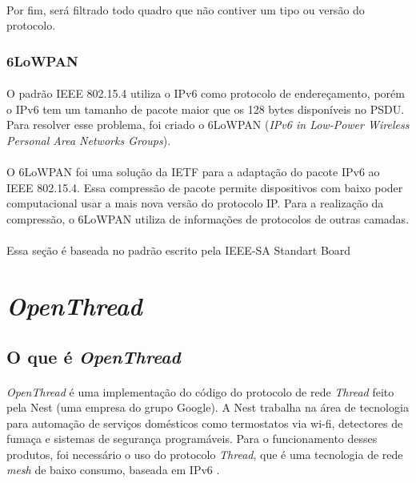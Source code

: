 \paragraph{} Por fim, será filtrado todo quadro que não contiver um tipo ou versão do protocolo. 

\subsubsection{6LoWPAN}
\paragraph{} O padrão IEEE 802.15.4 utiliza o IPv6 como protocolo de endereçamento, porém o IPv6 tem um tamanho de pacote maior que os 128 bytes disponíveis no PSDU. Para resolver esse problema, foi criado o 6LoWPAN (\textit{IPv6 in Low-Power Wireless Personal Area Networks Groups})\citep{6lowpan}.

\paragraph{} O 6LoWPAN foi uma solução da IETF para a adaptação do pacote IPv6 ao IEEE 802.15.4. Essa compressão de pacote permite dispositivos com baixo poder computacional usar a mais nova versão do protocolo IP. Para a realização da compressão, o 6LoWPAN utiliza de informações de protocolos de outras camadas.   

\paragraph{}Essa seção é baseada no padrão escrito pela IEEE-SA Standart Board \citep{IEEE2015}

\section{\textit{OpenThread}}
\subsection{O que é \textit{OpenThread}}
\paragraph{} \textit{OpenThread} é uma implementação do código do protocolo de rede \textit{Thread} feito pela Nest (uma empresa do grupo Google). A Nest trabalha na área de tecnologia para automação de serviços domésticos como termostatos via wi-fi, detectores de fumaça e sistemas de segurança programáveis. Para o funcionamento desses produtos, foi necessário o uso do protocolo \textit{Thread}, que é uma tecnologia de rede \textit{mesh} de baixo consumo, baseada em IPv6 \citep{Open}. 

